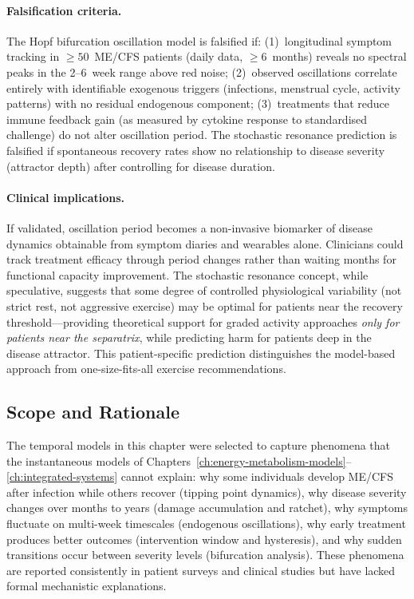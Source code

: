\paragraph{Falsification criteria.}
The Hopf bifurcation oscillation model is falsified if: (1)~longitudinal symptom tracking in $\geq 50$~ME/CFS patients (daily data, $\geq 6$~months) reveals no spectral peaks in the 2--6~week range above red noise; (2)~observed oscillations correlate entirely with identifiable exogenous triggers (infections, menstrual cycle, activity patterns) with no residual endogenous component; (3)~treatments that reduce immune feedback gain (as measured by cytokine response to standardised challenge) do not alter oscillation period. The stochastic resonance prediction is falsified if spontaneous recovery rates show no relationship to disease severity (attractor depth) after controlling for disease duration.

\paragraph{Clinical implications.}
If validated, oscillation period becomes a non-invasive biomarker of disease dynamics obtainable from symptom diaries and wearables alone. Clinicians could track treatment efficacy through period changes rather than waiting months for functional capacity improvement. The stochastic resonance concept, while speculative, suggests that some degree of controlled physiological variability (not strict rest, not aggressive exercise) may be optimal for patients near the recovery threshold---providing theoretical support for graded activity approaches \emph{only for patients near the separatrix}, while predicting harm for patients deep in the disease attractor. This patient-specific prediction distinguishes the model-based approach from one-size-fits-all exercise recommendations.

\subsection{Scope and Rationale}

The temporal models in this chapter were selected to capture phenomena that the instantaneous models of Chapters~\ref{ch:energy-metabolism-models}--\ref{ch:integrated-systems} cannot explain: why some individuals develop ME/CFS after infection while others recover (tipping point dynamics), why disease severity changes over months to years (damage accumulation and ratchet), why symptoms fluctuate on multi-week timescales (endogenous oscillations), why early treatment produces better outcomes (intervention window and hysteresis), and why sudden transitions occur between severity levels (bifurcation analysis). These phenomena are reported consistently in patient surveys and clinical studies but have lacked formal mechanistic explanations.

